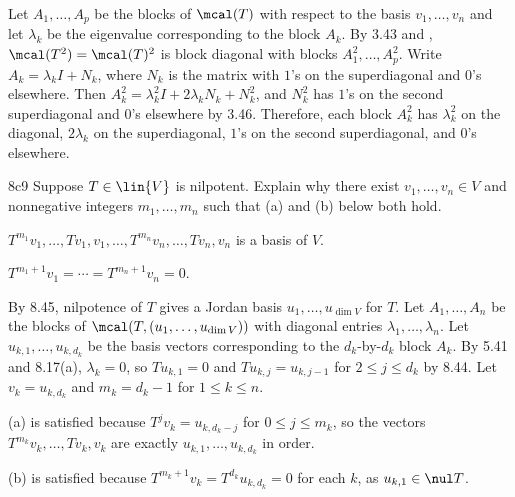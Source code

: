 \begin{sol}
    Let $A_1, \ldots, A_p$ be the blocks of $\mcal(T)$ with respect to the basis $v_1, \ldots, v_n$ and let $\lambda_k$ be the eigenvalue corresponding to the block $A_k$.
    By 3.43 and , $\mcal(T^2) = \mcal(T)^2$ is block diagonal with blocks $A_1^2, \ldots, A_p^2$.
    Write $A_k = \lambda_k I + N_k$, where $N_k$ is the matrix with $1$'s on the superdiagonal and $0$'s elsewhere.
    Then $A_k^2 = \lambda_k^2 I + 2 \lambda_k N_k + N_k^2$, and $N_k^2$ has $1$'s on the second superdiagonal and $0$'s elsewhere by 3.46.
    Therefore, each block $A_k^2$ has $\lambda_k^2$ on the diagonal, $2 \lambda_k$ on the superdiagonal, $1$'s on the second superdiagonal, and $0$'s elsewhere.
\end{sol}

\begin{exercise}{8c9}
    Suppose $T \in \lin{V}$ is nilpotent.
    Explain why there exist $v_1, \ldots, v_n \in V$ and nonnegative integers $m_1, \ldots, m_n$ such that (a) and (b) below both hold.
    \begin{subexercises}
        \item $T^{m_1} v_1, \ldots, Tv_1, v_1, \ldots, T^{m_n} v_n, \ldots, Tv_n, v_n$ is a basis of $V$.
        \item $T^{m_1 + 1} v_1 = \cdots = T^{m_n + 1} v_n = 0$.
    \end{subexercises}
\end{exercise}

\begin{sol}
    By 8.45, nilpotence of $T$ gives a Jordan basis $u_1, \ldots, u_{\dim V}$ for $T$.
    Let $A_1, \ldots, A_n$ be the blocks of $\mcal(T, (u_1, \ldots, u_{\dim V}))$ with diagonal entries $\lambda_1, \ldots, \lambda_n$.
    Let $u_{k, 1}, \ldots, u_{k, d_k}$ be the basis vectors corresponding to the $d_k$-by-$d_k$ block $A_k$.
    By 5.41 and 8.17(a), $\lambda_k = 0$, so $T u_{k, 1} = 0$ and $T u_{k, j} = u_{k, j-1}$ for $2 \leq j \leq d_k$ by 8.44.
    Let $v_k = u_{k, d_k}$ and $m_k = d_k - 1$ for $1 \leq k \leq n$.
    
    (a) is satisfied because $T^j v_k = u_{k, d_k - j}$ for $0 \leq j \leq m_k$, so the vectors $T^{m_k} v_k, \ldots, Tv_k, v_k$ are exactly $u_{k, 1}, \ldots, u_{k, d_k}$ in order.

    (b) is satisfied because $T^{m_k + 1} v_k = T^{d_k} u_{k, d_k} = 0$ for each $k$, as $u_{k, 1} \in \nul T$.
\end{sol}

